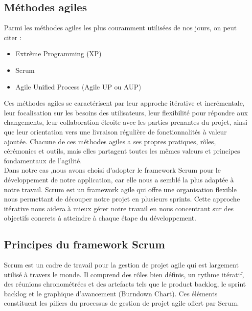     \subsection { Méthodes agiles}
    \noindent Parmi les méthodes agiles les plus couramment utilisées de nos jours, on peut citer :
    
\begin{itemize}[label=$\square$]
    \item Extrême Programming (XP)
    \item Scrum
    \item Agile Unified Process (Agile UP ou AUP)
 \end{itemize}

    Ces méthodes agiles se caractérisent par leur approche itérative et incrémentale, leur focalisation sur les besoins des utilisateurs, leur flexibilité pour répondre aux changements, leur collaboration étroite avec les parties prenantes du projet, ainsi que leur orientation vers une livraison régulière de fonctionnalités à valeur ajoutée. Chacune de ces méthodes agiles a ses propres pratiques, rôles, cérémonies et outils, mais elles partagent toutes les mêmes valeurs et principes fondamentaux de l'agilité.\\

   Dans notre cas ,nous avons choisi d'adopter le framework Scrum pour le développement de notre application, car elle nous a semblé la plus adaptée à notre travail. Scrum est un framework agile qui offre une organisation flexible nous permettant de découper notre projet en plusieurs sprints. Cette approche itérative nous aidera à mieux gérer notre travail en nous concentrant sur des objectifs concrets à atteindre à chaque étape du développement.
   
   
 
    
\newpage
    \subsection{ Principes du framework Scrum}
    Scrum est un cadre de travail pour la gestion de projet agile qui est largement utilisé à travers le monde. Il comprend des rôles bien définis, un rythme itératif, des réunions chronométrées et des artefacts tels que le product backlog, le sprint backlog et le graphique d'avancement (Burndown Chart). Ces éléments constituent les piliers du processus de gestion de projet agile offert par Scrum.\\
    
